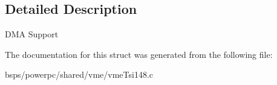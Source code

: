 \subsection{Detailed Description}
D\+MA Support 

The documentation for this struct was generated from the following file\+:\begin{DoxyCompactItemize}
\item 
bsps/powerpc/shared/vme/vme\+Tsi148.\+c\end{DoxyCompactItemize}
